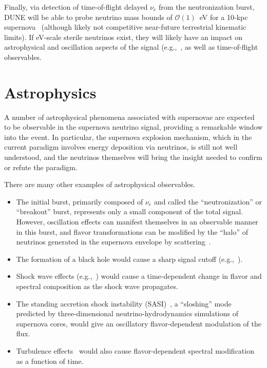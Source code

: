 Finally, via detection of time-of-flight delayed $\nu_e$ from the  neutronization burst,  DUNE will be able to probe neutrino mass bounds of $\mathcal{O}(1)$~eV for a 10-kpc supernova~\cite{Rossi-Torres:2015rla} (although likely not competitive near-future terrestrial kinematic limits).  If eV-scale sterile neutrinos exist, they will likely have an impact on astrophysical and oscillation aspects of the signal (e.g.,~\cite{Keranen:2007ga,Tamborra:2011is,Esmaili:2014gya}, as well as time-of-flight observables. \\


\section{Astrophysics}
\label{sec:physics-snblowe-astrophysics}


A number of astrophysical phenomena associated with supernovae are expected to be observable
in the supernova neutrino signal, providing a remarkable window into the event.  In particular, the supernova explosion mechanism, which in the current paradigm involves energy deposition via neutrinos, is still not well understood, and the neutrinos themselves will bring the insight needed to confirm or refute the paradigm.

There are many other examples of astrophysical observables.
\begin{itemize}
\item The initial burst, primarily composed of $\nu_e$ and called the
  ``neutronization'' or ``breakout''
  burst, %
  represents only a small component of the total signal.  However,
  oscillation effects can manifest themselves in an observable manner
  in this burst, and flavor transformations can be modified by the
  ``halo'' of neutrinos generated in the supernova envelope by
  scattering~\cite{Cherry:2013mv}.
\item The formation of a black hole would cause a sharp signal cutoff
  (e.g.,~\cite{Beacom:2000qy,Fischer:2008rh}).
\item Shock wave effects (e.g.,~\cite{Schirato:2002tg}) would cause a
  time-dependent change in flavor and spectral composition as the
  shock wave propagates.
\item The standing accretion shock instability
  (SASI)~\cite{Hanke:2011jf,Hanke:2013ena}, a ``sloshing'' mode
  predicted by three-dimensional neutrino-hydrodynamics simulations of
  supernova cores, would give an oscillatory flavor-dependent
  modulation of the flux.
\item Turbulence effects~\cite{Friedland:2006ta,Lund:2013uta} would
  also cause flavor-dependent spectral modification as a function of
  time.
\end{itemize}

